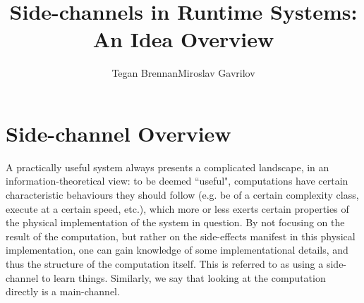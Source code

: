 \documentclass{article}
\begin{document}
     
\title{Side-channels in Runtime Systems:\\ An Idea Overview}
\author{Tegan Brennan\qquad Miroslav Gavrilov}
\maketitle

\section{Side-channel Overview}

A practically useful system always presents a complicated landscape, in an
information-theoretical view: to be deemed ``useful", computations have certain
characteristic behaviours they should follow (e.g. be of a certain complexity
class, execute at a certain speed, etc.), which more or less exerts certain
properties of the physical implementation of the system in question. By not
focusing on the result of the computation, but rather on the side-effects
manifest in this physical implementation, one can gain knowledge of some
implementational details, and thus the structure of the computation itself. This
is referred to as using a side-channel to learn things. Similarly, we say that
looking at the computation directly is a main-channel.
\end{document}
